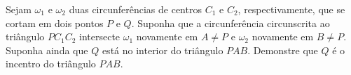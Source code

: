 Sejam $\omega_1$ e $\omega_2$ duas circunferências de centros $C_1$ e $C_2$, respectivamente, que se cortam em dois pontos $P$ e $Q$. Suponha que a circunferência circunscrita ao triângulo $PC_1C_2$ intersecte $\omega_1$ novamente em $A \neq P$ e $\omega_2$ novamente em $B \neq P$. Suponha ainda que $Q$ está no interior do triângulo $PAB$. Demonstre que $Q$ é o incentro do triângulo $PAB$.

